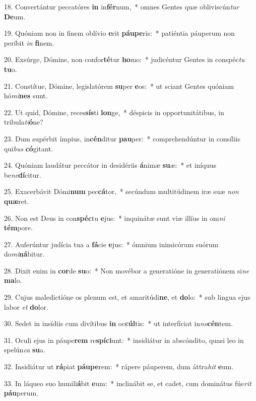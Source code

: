 18. Convertántur peccatóres \textbf{in} in\textbf{fér}num,~*  omnes Gentes quæ obliviscún\textit{tur} \textbf{De}um.\

19. Quóniam non in finem oblívio \textbf{e}rit \textbf{páu}\textbf{pe}ris:~*  patiéntia páuperum non períbit \textit{in} \textbf{fi}nem.\

20. Exsúrge, Dómine, non confor\textbf{té}tur \textbf{ho}mo:~*  judicéntur Gentes in conspéc\textit{tu} \textbf{tu}o.\

21. Constítue, Dómine, legislatórem \textbf{su}per \textbf{e}os:~*  ut sciant Gentes quóniam hó\textit{mi}\textbf{nes} sunt.\

22. Ut quid, Dómine, reces\textbf{sís}ti \textbf{lon}ge,~*  déspicis in opportunitátibus, in tribula\textit{ti}\textbf{ó}ne?\

23. Dum supérbit ímpius, in\textbf{cén}ditur \textbf{pau}per:~*  comprehendúntur in consíliis qui\textit{bus} \textbf{có}gitant.\

24. Quóniam laudátur peccátor in desidériis \textbf{á}nimæ \textbf{su}æ:~*  et iníquus be\textit{ne}\textbf{dí}citur.\

25. Exacerbávit Dómi\textbf{num} pec\textbf{cá}tor,~*  secúndum multitúdinem iræ suæ \textit{non} \textbf{quæ}ret.\

26. Non est Deus in con\textbf{spéc}tu \textbf{e}jus:~*  inquinátæ sunt viæ illíus in om\textit{ni} \textbf{tém}pore.\

27. Auferúntur judícia tua a \textbf{fá}cie \textbf{e}jus:~*  ómnium inimicórum suórum do\textit{mi}\textbf{ná}bitur.\

28. Dixit enim in \textbf{cor}de \textbf{su}o:~*  Non movébor a generatióne in generatiónem si\textit{ne} \textbf{ma}lo.\

29. Cujus maledictióne os plenum est, et amaritúdi\textbf{ne}, et \textbf{do}lo:~*  sub lingua ejus labor \textit{et} \textbf{do}lor.\

30. Sedet in insídiis cum divítibus \textbf{in} oc\textbf{cúl}tis:~*  ut interfíciat in\textit{no}\textbf{cén}tem.\

31. Oculi ejus in páupe\textbf{rem} re\textbf{spí}\textbf{ci}unt:~*  insidiátur in abscóndito, quasi leo in spelún\textit{ca} \textbf{su}a.\

32. Insidiátur ut \textbf{rá}piat \textbf{páu}\textbf{pe}rem:~*  rápere páuperem, dum áttra\textit{hit} \textbf{e}um.\

33. In láqueo suo humili\textbf{á}bit \textbf{e}um:~*  inclinábit se, et cadet, cum dominátus fúe\textit{rit} \textbf{páu}perum.\

